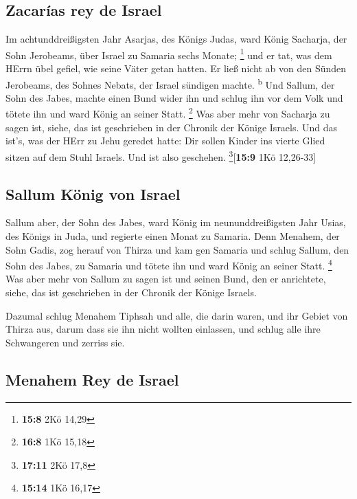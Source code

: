 \hypertarget{zacaruxedas-rey-de-israel}{%
\subsection{Zacarías rey de Israel}\label{zacaruxedas-rey-de-israel}}

 Im achtunddreißigsten Jahr Asarjas, des Königs Judas,
ward König Sacharja, der Sohn Jerobeams, über Israel zu Samaria sechs
Monate; \footnote{\textbf{15:8} 2Kö 14,29}  und er tat,
was dem HErrn übel gefiel, wie seine Väter getan hatten. Er ließ nicht
ab von den Sünden Jerobeams, des Sohnes Nebats, der Israel sündigen
machte. \textsuperscript{b}  Und Sallum, der Sohn des
Jabes, machte einen Bund wider ihn und schlug ihn vor dem Volk und
tötete ihn und ward König an seiner Statt. \footnote{\textbf{16:8} 1Kö
  15,18}  Was aber mehr von Sacharja zu sagen ist, siehe,
das ist geschrieben in der Chronik der Könige Israels. 
Und das ist's, was der HErr zu Jehu geredet hatte: Dir sollen Kinder ins
vierte Glied sitzen auf dem Stuhl Israels. Und ist also geschehen.
\footnote{\textbf{17:11} 2Kö 17,8}{[}\textbf{15:9} 1Kö 12,26-33{]}

\hypertarget{sallum-kuxf6nig-von-israel}{%
\subsection{Sallum König von Israel}\label{sallum-kuxf6nig-von-israel}}

 Sallum aber, der Sohn des Jabes, ward König im
neununddreißigsten Jahr Usias, des Königs in Juda, und regierte einen
Monat zu Samaria.  Denn Menahem, der Sohn Gadis, zog
herauf von Thirza und kam gen Samaria und schlug Sallum, den Sohn des
Jabes, zu Samaria und tötete ihn und ward König an seiner Statt.
\footnote{\textbf{15:14} 1Kö 16,17}  Was aber mehr von
Sallum zu sagen ist und seinen Bund, den er anrichtete, siehe, das ist
geschrieben in der Chronik der Könige Israels.

 Dazumal schlug Menahem Tiphsah und alle, die darin
waren, und ihr Gebiet von Thirza aus, darum dass sie ihn nicht wollten
einlassen, und schlug alle ihre Schwangeren und zerriss sie.

\hypertarget{menahem-rey-de-israel}{%
\subsection{Menahem Rey de Israel}\label{menahem-rey-de-israel}}

